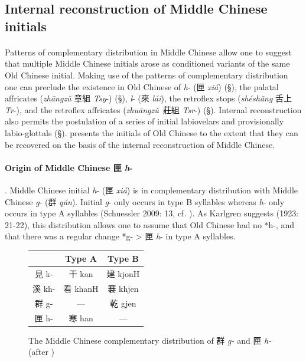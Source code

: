 \subsection{Internal reconstruction of Middle Chinese
initials}\label{internal-reconstruction-of-middle-chinese-initials}

\paragraph{} Patterns of complementary distribution in Middle Chinese allow one to
suggest that multiple Middle Chinese initials arose as conditioned
variants of the same Old Chinese initial. Making use of the patterns of
complementary distribution one can preclude the existence in Old Chinese
of \emph{h}- (匣 \emph{xiá}) (§), the palatal affricates (\emph{zhāngzǔ}
章組 \emph{Tsy}-) (§),  \emph{l}- (來  \emph{lái}), the retroflex stops
(\emph{shéshǎng} 舌上  \emph{Tr}-), and the retroflex affricates
(\emph{zhuāngzǔ~}莊組 \emph{Tsr}-) (§). Internal re­con­struc­tion also
permits the postulation of a series of initial labiovelars and
provisionally labio-glottals (§). presents the initials of Old Chinese
to the extent that they can be recovered on the basis of the internal
reconstruction of Middle Chinese.

\paragraph{Origin of Middle Chinese 匣 \emph{\textbf{h}}-}. Middle
Chinese initial \emph{h}- (匣 \emph{xiá}) is in complementary
dis­tri­bu­tion with Middle Chinese \emph{g}- (群  \emph{qún}). Initial
 \emph{g}- only occurs in type B syllables whereas \emph{h}- only occurs
in type A syllables (Schuessler 2009: 13, cf. ). As Karlgren suggests
(1923: 21-22), this distribution allows one to assume that Old Chinese
had no *h-, and that there was a regular change *g- \textgreater{} 匣
 \emph{h}- in type A syllables.

\begin{figure}
    \centering
\begin{tabular}{|c|c|c|}
\hline
&
Type A &
Type B \\
\hline
見 k- &
干 kan &
建 kjonH \\
\hline
溪 kh- &
看 khanH &
褰 khjen \\
\hline
群 g- &
--- &
乾 gjen \\
\hline
匣 h- &
寒 han &
--- \\
\hline
\end{tabular}
    \caption{The Middle Chinese complementary distribution 
of 群 \textit{g-} and 匣 \textit{h-} (after \cite{Schuessler2009minimal})}
    \label{fig:HandG}
\end{figure}

